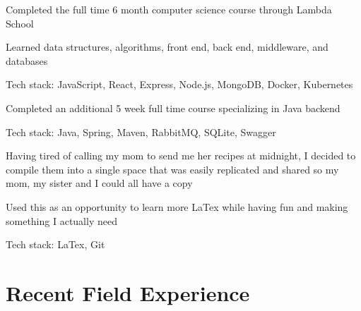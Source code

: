 \documentclass[letterpaper]{resume}
\begin{document}
\begin{compactitem}
\item Completed the full time 6 month computer science course through Lambda School
\item Learned data structures, algorithms, front end, back end, middleware, and databases
\item Tech stack: JavaScript, React, Express, Node.js, MongoDB, Docker, Kubernetes
\item Completed an additional 5 week full time course specializing in Java backend
\item Tech stack: Java, Spring, Maven, RabbitMQ, SQLite, Swagger
\end{compactitem}

\begin{compactitem}
\item Having tired of calling my mom to send me her recipes at midnight, I decided to compile them into a single space that was easily replicated and shared so my mom, my sister and I could all have a copy
\item Used this as an opportunity to learn more LaTex while having fun and making something I actually need
\item Tech stack: LaTex, Git
\end{compactitem}

\section{Recent Field Experience}
\end{document}
